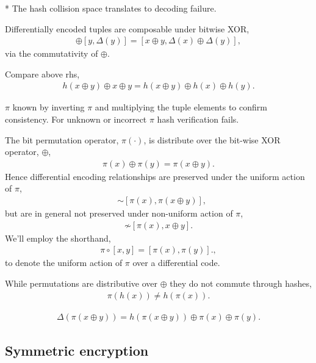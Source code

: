 \documentclass[twocolumn, aps, amsmath, amssymb, nofootinbib, superscriptaddress, longbibliography, doublefloatfix, table-of-contents, eqsecnum, rmp]{revtex4-2}
\begin{document}
* The hash collision space translates to decoding failure.

Differentially encoded tuples are composable under bitwise XOR,
\begin{align}
	[x,\Delta(x)] \oplus [y,\Delta(y)] = [x\oplus y, \Delta(x)\oplus \Delta(y)],
\end{align}
via the commutativity of $\oplus$.

Compare above rhs,
\begin{align}
	h(x\oplus y) \oplus x \oplus y = h(x \oplus y) \oplus h(x) \oplus h(y).
\end{align}

$\pi$ known by inverting $\pi$ and multiplying the tuple elements to confirm consistency. For unknown or incorrect $\pi$ hash verification fails.

The bit permutation operator, $\pi(\cdot)$, is distribute over the bit-wise XOR operator, $\oplus$,
\begin{align}
	\pi(x)\oplus \pi(y) = \pi(x\oplus y).
\end{align}
Hence differential encoding relationships are preserved under the uniform action of $\pi$,
\begin{align}
	[x,x\oplus y] &\sim [\pi(x), \pi(x\oplus y)],
\end{align}
but are in general not preserved under non-uniform action of $\pi$,
\begin{align}
	[x,x\oplus y] \not\sim [\pi(x), x\oplus y].
\end{align}
We'll employ the shorthand,
\begin{align}
	\pi\circ[x,y] = [\pi(x),\pi(y)].,
\end{align}
to denote the uniform action of $\pi$ over a differential code.

While permutations are distributive over $\oplus$ they do not commute through hashes,
\begin{align}
	\pi(h(x)) \neq h(\pi(x)).	
\end{align}

\begin{align}
	\Delta(\pi(x\oplus y)) = h(\pi(x\oplus y)) \oplus \pi(x) \oplus \pi(y).
\end{align}

\subsection{Symmetric encryption}
\end{document}
